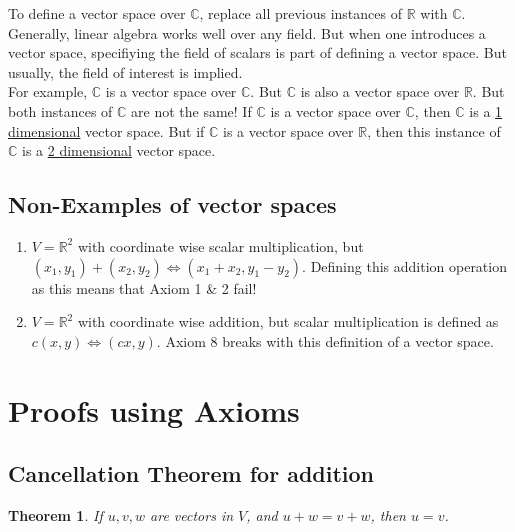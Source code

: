 \documentclass{article}
\newtheorem{theorem}{Theorem}[section]
\newtheorem{one minute paper}[theorem]{One Minute Paper}
\begin{document}
To define a vector space over $\mathbb{C}$, replace all previous instances of $\mathbb{R}$ with $\mathbb{C}$. \\

Generally, linear algebra works well over any field. But when one introduces a vector space, specifiying the field of scalars is part of defining a vector space. But usually, the field of interest is implied. \\

For example, $\mathbb{C}$ is a vector space over $\mathbb{C}$. But $\mathbb{C}$ is also a vector space over $\mathbb{R}$. But both instances of $\mathbb{C}$ are not the same! If $\mathbb{C}$ is a vector
space over $\mathbb{C}$, then $\mathbb{C}$ is a \underline{1 dimensional} vector space. But if $\mathbb{C}$ is a vector space over $\mathbb{R}$, then this instance of $\mathbb{C}$ is a \underline{2 dimensional} vector space. 

\subsection*{Non-Examples of vector spaces}
\begin{enumerate}
    \item $V = \mathbb{R}^2$ with coordinate wise scalar multiplication, but $(x_1, y_1) + (x_2, y_2) \iff (x_1 + x_2, y_1 - y_2)$. Defining this addition operation as this means that Axiom 1 \& 2 fail!
    \item $V = \mathbb{R}^2$ with coordinate wise addition, but scalar multiplication is defined as $c(x,y) \iff (cx, y)$. Axiom 8 breaks with this definition of a vector space. 
\end{enumerate}

\newpage

\section*{Proofs using Axioms}

\subsection*{Cancellation Theorem for addition}

\begin{theorem}
    If $u,v,w$ are vectors in $V$, and $u + w = v + w$, then $u = v$. 
\end{theorem}
\end{document}
